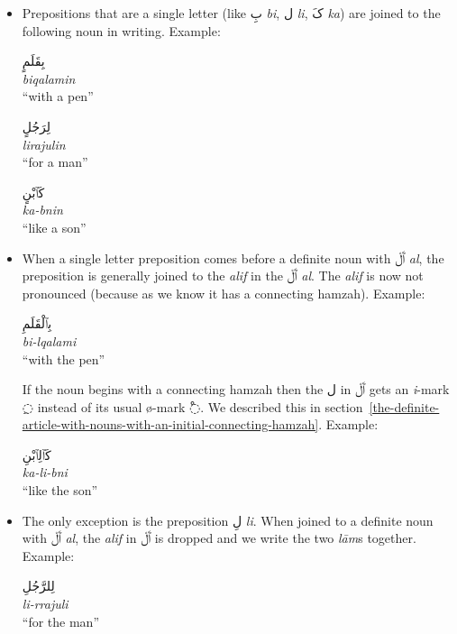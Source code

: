\documentclass[
  10pt,
]{book}
\begin{document}
\begin{itemize}
\item
  Prepositions that are a single letter (like
  \foreignlanguage{arabic}{بِ} \emph{bi}, \foreignlanguage{arabic}{ل} \emph{li}, \foreignlanguage{arabic}{کَ} \emph{ka}) are joined to the following noun in writing. Example:

  \foreignlanguage{arabic}{بِقَلَمٍ}\\
  \emph{biqalamin}\\
  \enquote{with a pen}

  \foreignlanguage{arabic}{لِرَجُلٍ}\\
  \emph{lirajulin}\\
  \enquote{for a man}

  \foreignlanguage{arabic}{کَٱبْنٍ}\\
  \emph{ka-bnin}\\
  \enquote{like a son}
\item
  When a single letter preposition comes before a definite noun with \foreignlanguage{arabic}{ٱَلْ} \emph{al}, the preposition is generally joined to the \emph{alif} in the \foreignlanguage{arabic}{ٱَلْ} \emph{al}. The \emph{alif} is now not pronounced (because as we know it has a connecting hamzah). Example:

  \foreignlanguage{arabic}{بِٱلْقَلَمِ}\\
  \emph{bi-lqalami}\\
  \enquote{with the pen}

  If the noun begins with a connecting hamzah then the \foreignlanguage{arabic}{ل} in \foreignlanguage{arabic}{ٱَلْ} gets an \emph{i}-mark \foreignlanguage{arabic}{◌ِ} instead of its usual ø-mark \foreignlanguage{arabic}{◌ْ}. We described this in
  section~\ref{the-definite-article-with-nouns-with-an-initial-connecting-hamzah}.
  Example:

  \foreignlanguage{arabic}{کَٱلِٱبْنِ}\\
  \emph{ka-li-bni}\\
  \enquote{like the son}
\item
  The only exception is the preposition \foreignlanguage{arabic}{لِ} \emph{li}. When joined to a definite noun with \foreignlanguage{arabic}{ٱَلْ} \emph{al}, the \emph{alif} in \foreignlanguage{arabic}{ٱَلْ} is dropped and we write the two \emph{lām}s together. Example:

  \foreignlanguage{arabic}{لِلرَّجُلِ}\\
  \emph{li-rrajuli}\\
  \enquote{for the man}


\end{itemize}
\end{document}
